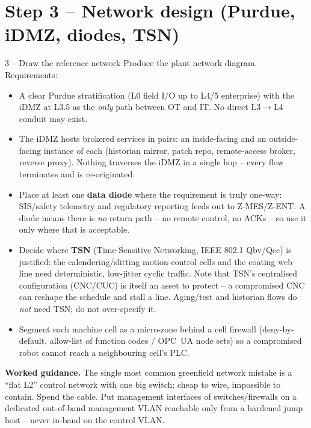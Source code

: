 \documentclass[11pt,a4paper]{article}
\begin{document}
\section*{Step 3 -- Network design (Purdue, iDMZ, diodes, TSN)}

\begin{stepbox}{3 -- Draw the reference network}
Produce the plant network diagram. Requirements:
\begin{itemize}\setlength{\itemsep}{1pt}
  \item A clear Purdue stratification (L0 field I/O up to L4/5
    enterprise) with the iDMZ at L3.5 as the \emph{only} path between OT
    and IT. No direct L3$\to$L4 conduit may exist.
  \item The iDMZ hosts brokered services in pairs: an inside-facing and
    an outside-facing instance of each (historian mirror, patch repo,
    remote-access broker, reverse proxy). Nothing traverses the iDMZ in
    a single hop -- every flow terminates and is re-originated.
  \item Place at least one \textbf{data diode} where the requirement is
    truly one-way: SIS/safety telemetry and regulatory reporting feeds
    out to Z-MES/Z-ENT. A diode means there is \emph{no} return path --
    no remote control, no ACKs -- so use it only where that is acceptable.
  \item Decide where \textbf{TSN} (Time-Sensitive Networking, IEEE 802.1
    Qbv/Qcc) is justified: the calendering/slitting motion-control cells
    and the coating web line need deterministic, low-jitter cyclic
    traffic. Note that TSN's centralised configuration (CNC/CUC) is
    itself an asset to protect -- a compromised CNC can reshape the
    schedule and stall a line. Aging/test and historian flows do
    \emph{not} need TSN; do not over-specify it.
  \item Segment each machine cell as a micro-zone behind a cell firewall
    (deny-by-default, allow-list of function codes / OPC~UA node sets)
    so a compromised robot cannot reach a neighbouring cell's PLC.
\end{itemize}

\medskip
\noindent\textbf{Worked guidance.} The single most common greenfield
network mistake is a ``flat L2'' control network with one big switch:
cheap to wire, impossible to contain. Spend the cable. Put management
interfaces of switches/firewalls on a dedicated out-of-band management
VLAN reachable only from a hardened jump host -- never in-band on the
control VLAN.
\end{stepbox}
\end{document}
